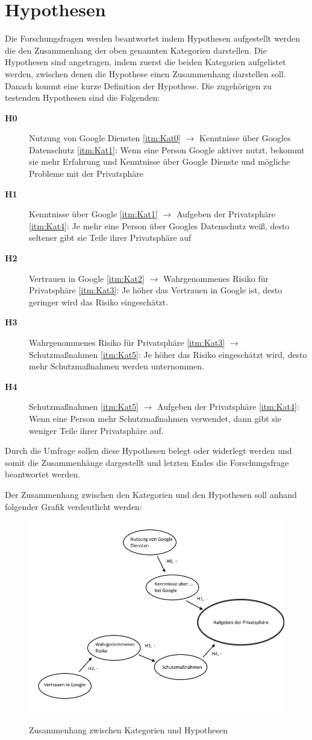 \section{Hypothesen}
Die Forschungsfragen werden beantwortet indem Hypothesen aufgestellt werden die den Zusammenhang der oben genannten Kategorien darstellen.
Die Hypothesen sind angetragen, indem zuerst die beiden Kategorien aufgelistet werden, zwischen denen die Hypothese einen Zusammenhang darstellen soll. Danach kommt eine kurze Definition der Hypothese.
Die zugehörigen zu testenden Hypothesen sind die Folgenden:
\begin{description}
\item[\label{itm:H0}\textbf{H0}] Nutzung von Google Diensten \ref{itm:Kat0} $\rightarrow$ Kenntnisse über Googles Datenschutz \ref{itm:Kat1}: Wenn eine Person Google aktiver nutzt, bekommt sie mehr Erfahrung und Kenntnisse über Google Dienste und mögliche Probleme mit der Privatsphäre
\item[\label{itm:H1}\textbf{H1}] Kenntnisse über Google \ref{itm:Kat1} $\rightarrow$ Aufgeben der Privatsphäre \ref{itm:Kat4}: Je mehr eine Person über Googles Datenschutz weiß, desto seltener gibt sie Teile ihrer Privatsphäre auf
\item[\label{itm:H2}\textbf{H2}] Vertrauen in Google \ref{itm:Kat2} $\rightarrow$ Wahrgenommenes Risiko für Privatsphäre \ref{itm:Kat3}: Je höher das Vertrauen in Google ist, desto geringer wird das Risiko eingeschätzt.
\item[\label{itm:H3}\textbf{H3}] Wahrgenommenes Risiko für Privatsphäre \ref{itm:Kat3} $\rightarrow$ Schutzmaßnahmen \ref{itm:Kat5}: Je höher das Risiko eingeschätzt wird, desto mehr Schutzmaßnahmen werden unternommen.
\item[\label{itm:H4}\textbf{H4}] Schutzmaßnahmen \ref{itm:Kat5} $\rightarrow$ Aufgeben der Privatsphäre \ref{itm:Kat4}: Wenn eine Person mehr Schutzmaßnahmen verwendet, dann gibt sie weniger Teile ihrer Privatsphäre auf.
\end{description}
Durch die Umfrage sollen diese Hypothesen belegt oder widerlegt werden und somit die Zusammenhänge dargestellt und letzten Endes die Forschungsfrage beantwortet werden.

Der Zusammenhang zwischen den Kategorien und den Hypothesen soll anhand folgender Grafik verdeutlicht werden:
\begin{figure}[H]
\centering
\includegraphics[scale=0.55]{images/bubbles}\\
\caption{Zusammenhang zwischen Kategorien und Hypothesen}\label{bubbles}
\end{figure}
